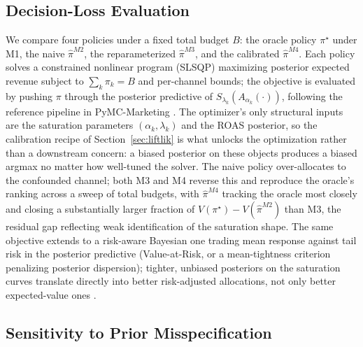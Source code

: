 \documentclass{uai2026} %
\begin{document}

\subsection{Decision-Loss Evaluation}\label{sec:decision}

We compare four policies under a fixed total budget $B$: the oracle policy $\pi^\star$ under M1, the naive $\hat\pi^{M2}$, the reparameterized $\hat\pi^{M3}$, and the calibrated $\hat\pi^{M4}$.
Each policy solves a constrained nonlinear program (SLSQP) maximizing posterior expected revenue subject to $\sum_k \pi_k = B$ and per-channel bounds; the objective is evaluated by pushing $\pi$ through the posterior predictive of $S_{\lambda_k}(A_{\alpha_k}(\cdot))$, following the reference pipeline in PyMC-Marketing \citep{pymcmarketing_budget_allocation}.
The optimizer's only structural inputs are the saturation parameters $(\alpha_k, \lambda_k)$ and the ROAS posterior, so the calibration recipe of Section~\ref{sec:liftlik} is what unlocks the optimization rather than a downstream concern: a biased posterior on these objects produces a biased argmax no matter how well-tuned the solver.
The naive policy over-allocates to the confounded channel; both M3 and M4 reverse this and reproduce the oracle's ranking across a sweep of total budgets, with $\hat\pi^{M4}$ tracking the oracle most closely and closing a substantially larger fraction of $V(\pi^\star) - V(\hat\pi^{M2})$ than M3, the residual gap reflecting weak identification of the saturation shape.
The same objective extends to a risk-aware Bayesian one trading mean response against tail risk in the posterior predictive (Value-at-Risk, or a mean-tightness criterion penalizing posterior dispersion); tighter, unbiased posteriors on the saturation curves translate directly into better risk-adjusted allocations, not only better expected-value ones \citep{pymcmarketing_allocation_assessment}.

\subsection{Sensitivity to Prior Misspecification}\label{sec:sensitivity}
\end{document}
